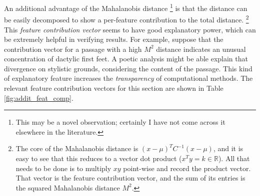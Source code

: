 \documentclass[11pt,a4paper]{scrartcl} %
\begin{document}
{An additional advantage of the Mahalanobis distance%
\footnote{This may be a novel observation; certainly I have not come across it elsewhere in the literature.}
is that the distance can be easily decomposed to show a per-feature contribution to the total distance.%
\footnote{The core of the Mahalanobis distance is $(x-\mu)^{T}C^{-1}(x-\mu)$, and it is easy to see that this reduces to a vector dot product ($x^{T}y=k \in \mathbb{R}$). All that needs to be done is to multiply $xy$ point-wise and record the product vector. That vector is the feature contribution vector, and the sum of its entries is the squared Mahalanobis distance $M^{2}$.}
This \textit{feature contribution vector} seems to have good explanatory power, which can be extremely helpful in verifying results. For example, suppose that the contribution vector for a passage with a high $M^{2}$ distance indicates an unusual concentration of dactylic first feet. A poetic analysis might be able explain that divergence on stylistic grounds, considering the content of the passage. This kind of explanatory feature increases the \textit{transparency} of computational methods. The relevant feature contribution vectors for this section are shown in Table \ref{fig:addit_feat_comp}.

}
\end{document}
